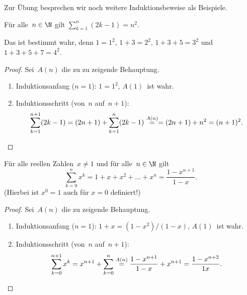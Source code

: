 \documentclass[a4paper]{article}
\begin{document}
Zur Übung besprechen wir noch weitere Induktionsbeweise als Beispiele.

\begin{theorem}
    Für alle~$n \in \N$ gilt $\sum_{k=1}^n (2k-1) = n^2$.
\end{theorem}

Das ist bestimmt wahr, denn $1 = 1^2$, $1+3 = 2^2$, $1+3+5 = 3^2$ und $1+3+5+7 = 4^2$.

\begin{proof}
    Sei~$A(n)$ die zu zu zeigende Behauptung.
    \begin{enumerate}
        \item Induktionsanfang ($n = 1$): $1 = 1^2$, $A(1)$~ist wahr.
        \item Induktionsschritt (von~$n$ auf~$n+1$):
              \begin{equation*}
                  \sum_{k=1}^{n+1} (2k-1) = (2n+1) + \sum_{k=1}^n (2k-1) \overset{A(n)}{=} = (2n+1) + n^2 = (n+1)^2. \qedhere
              \end{equation*}
    \end{enumerate}
\end{proof}

\begin{theorem}
    Für alle reellen Zahlen~$x \neq 1$ und für alle~$n \in \N$ gilt
    \begin{equation*}
        \sum_{k=0}^n x^k = 1 + x + x^2 + \dots + x^n = \frac{1-x^{n+1}}{1-x}.
    \end{equation*}
    (Hierbei ist $x^0 = 1$ auch für $x = 0$ definiert!)
\end{theorem}

\begin{proof}
    Sei~$A(n)$ die zu zeigende Behauptung.
    \begin{enumerate}
        \item Induktionsanfang ($n=1$): $1 + x = (1-x^2) / (1-x)$, $A(1)$~ist wahr.
        \item Induktionsschritt (von~$n$ auf~$n + 1$):
              \begin{equation*}
                  \sum_{k=0}^{n+1} x^k = x^{n+1} + \sum_{k=0}^n \overset{A(n)}{=} \frac{1-x^{n+1}}{1-x} + x^{n+1} = \frac{1-x^{n+2}}{1x}. \qedhere
              \end{equation*}
    \end{enumerate}
\end{proof}
\end{document}
